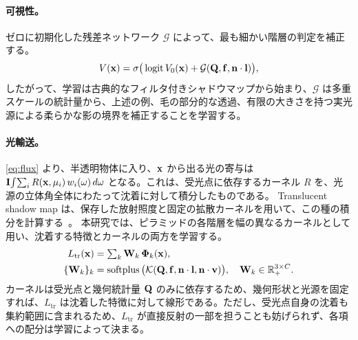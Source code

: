 \paragraph{可視性。}
ゼロに初期化した残差ネットワーク $\mathcal G$ によって、最も細かい階層の判定を補正する。
\begin{equation}
  V(\mathbf{x})=\sigma\big(\operatorname{logit} V_0(\mathbf{x})+\mathcal G(\mathbf{Q},\mathbf{f},\mathbf{n}\cdot\mathbf{l})\big),
  \label{eq:visibility}
\end{equation}
したがって、学習は古典的なフィルタ付きシャドウマップから始まり、$\mathcal G$ は多重スケールの統計量から、上述の例、毛の部分的な透過、有限の大きさを持つ実光源による柔らかな影の境界を補正することを学習する。

\paragraph{光輸送。}
\cref{eq:flux} より、半透明物体に入り、$\mathbf{x}$ から出る光の寄与は $\mathbf{I}\!\int\!\sum_i R(\mathbf{x},\mu_i)\,w_i(\omega)\,d\omega$ となる。これは、受光点に依存するカーネル $R$ を、光源の立体角全体にわたって沈着に対して積分したものである。
Translucent shadow map は、保存した放射照度と固定の拡散カーネルを用いて、この種の積分を計算する~\cite{dachsbacher2003translucent,deon2007efficient,jimenez2010real}。
本研究では、ピラミッドの各階層を幅の異なるカーネルとして用い、沈着する特徴とカーネルの両方を学習する。
\begin{align}
  L_{\mathrm{tr}}(\mathbf{x})&=\textstyle\sum_{k}\mathbf{W}_k\,\boldsymbol\Phi_k(\mathbf{x}),\label{eq:transfer}\\
  \{\mathbf{W}_k\}_k&=\operatorname{softplus}\big(\mathcal K(\mathbf{Q},\mathbf{f},\mathbf{n}\cdot\mathbf{l},\mathbf{n}\cdot\mathbf{v})\big),\quad \mathbf{W}_k\in\mathbb R_+^{3\times C}.\nonumber
\end{align}
カーネルは受光点と幾何統計量 $\mathbf{Q}$ のみに依存するため、幾何形状と光源を固定すれば、$L_{\mathrm{tr}}$ は沈着した特徴に対して線形である。ただし、受光点自身の沈着も集約範囲に含まれるため、$L_{\mathrm{tr}}$ が直接反射の一部を担うことも妨げられず、各項への配分は学習によって決まる。

